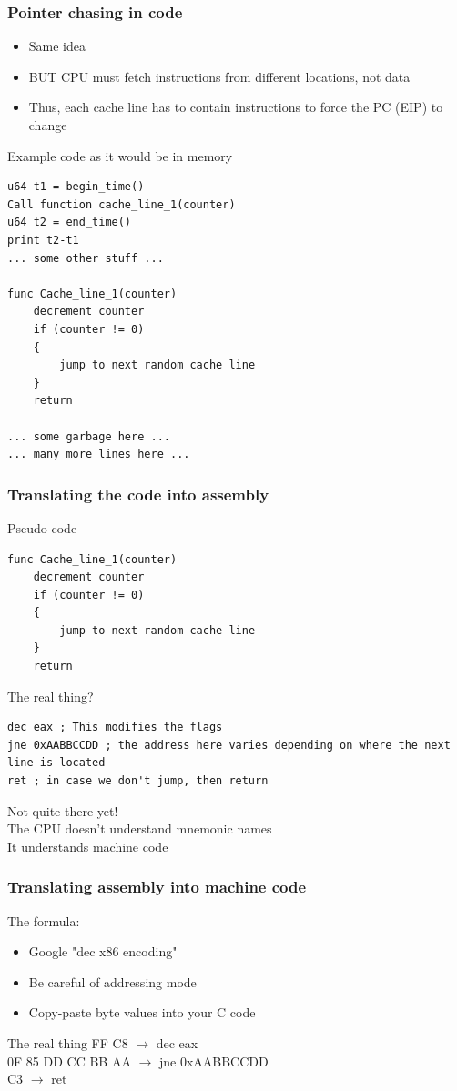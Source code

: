 \documentclass{beamer}
\begin{document}
\begin{frame}[fragile]
\frametitle{Pointer chasing in code}
\begin{itemize}
\item Same idea
\item BUT CPU must fetch instructions from different locations, not data
\item Thus, each cache line has to contain instructions to force the PC (EIP) to change
\end{itemize}
\begin{block}{Example code as it would be in memory}
\begin{lstlisting}[style=code]
u64 t1 = begin_time()
Call function cache_line_1(counter)
u64 t2 = end_time()
print t2-t1
... some other stuff ...

func Cache_line_1(counter)
    decrement counter
    if (counter != 0)
    {
        jump to next random cache line
    }
    return

... some garbage here ...
... many more lines here ...
\end{lstlisting}
\end{block}
\end{frame}

\begin{frame}[fragile]
\frametitle{Translating the code into assembly}
\begin{block}{Pseudo-code}
\begin{lstlisting}[style=code]
func Cache_line_1(counter)
    decrement counter
    if (counter != 0)
    {
        jump to next random cache line
    }
    return
\end{lstlisting}
\end{block}
\begin{block}{The real thing?}
\begin{lstlisting}[style=code]
dec eax ; This modifies the flags
jne 0xAABBCCDD ; the address here varies depending on where the next line is located
ret ; in case we don't jump, then return
\end{lstlisting}
\end{block}
Not quite there yet!\\
The CPU doesn't understand mnemonic names\\
It understands machine code
\end{frame}

\begin{frame}[fragile]
\frametitle{Translating assembly into machine code}
The formula:\\
\begin{itemize}
\item Google "dec x86 encoding"
\item Be careful of addressing mode
\item Copy-paste byte values into your C code
\end{itemize}
\begin{block}{The real thing}
FF C8 $\rightarrow$ dec eax\\
0F 85 DD CC BB AA $\rightarrow$ jne 0xAABBCCDD\\
C3 $\rightarrow$ ret
\end{block}
\end{frame}
\end{document}
